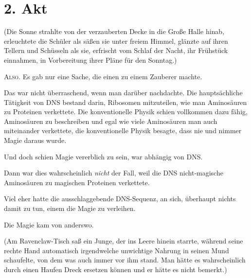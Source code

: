 \section{2. Akt}
(Die Sonne strahlte von der verzauberten Decke in die Große Halle hinab, erleuchtete die Schüler als säßen sie unter freiem Himmel, glänzte auf ihren Tellern und Schüsseln als sie, erfrischt vom Schlaf der Nacht, ihr Frühstück einnahmen, in Vorbereitung ihrer Pläne für den Sonntag.)

\lettrine{A}{lso.} Es gab nur eine Sache, die einen zu einem Zauberer machte.

Das war nicht überraschend, wenn man darüber nachdachte. Die hauptsächliche Tätigkeit von DNS bestand darin, Ribosomen mitzuteilen, wie man Aminosäuren zu Proteinen verkettete. Die konventionelle Physik schien vollkommen dazu fähig, Aminosäuren zu beschreiben und egal wie viele Aminosäuren man auch miteinander verkettete, die konventionelle Physik besagte, dass nie und nimmer Magie daraus wurde.

Und doch schien Magie vererblich zu sein, war abhängig von DNS.

Dann war dies wahrscheinlich \emph{nicht} der Fall, weil die DNS nicht-magische Aminosäuren zu magischen Proteinen verkettete.

Viel eher hatte die ausschlaggebende DNS-Sequenz, an sich, überhaupt nichts damit zu tun, einem die Magie zu verleihen.

Die Magie kam von anderswo.

(Am Ravenclaw-Tisch saß ein Junge, der ins Leere hinein starrte, während seine rechte Hand automatisch irgendwelche unwichtige Nahrung in seinen Mund schaufelte, von dem was auch immer vor ihm stand. Man hätte es wahrscheinlich durch einen Haufen Dreck ersetzen können und er hätte es nicht bemerkt.)

